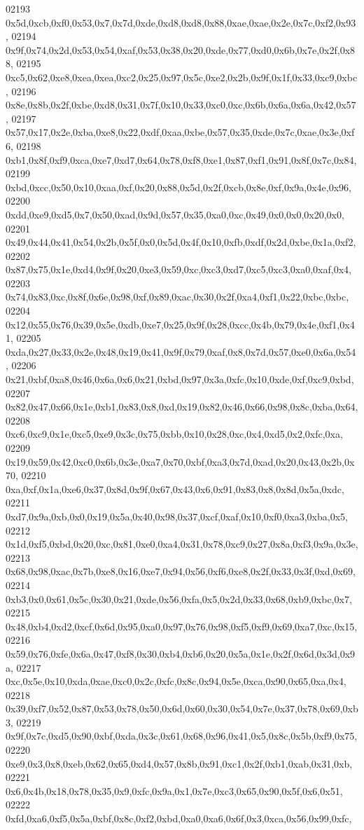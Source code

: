 \begin{DoxyCode}
02193   0x5d,0xcb,0xf0,0x53,0x7,0x7d,0xde,0xd8,0xd8,0x88,0xae,0xae,0x2e,0x7c,0xf2,0x93,
02194   0x9f,0x74,0x2d,0x53,0x54,0xaf,0x53,0x38,0x20,0xde,0x77,0xd0,0x6b,0x7e,0x2f,0x88,
02195   0xc5,0x62,0xe8,0xea,0xea,0xc2,0x25,0x97,0x5c,0xe2,0x2b,0x9f,0x1f,0x33,0xc9,0xbc,
02196   0x8e,0x8b,0x2f,0xbe,0xd8,0x31,0x7f,0x10,0x33,0xc0,0xc,0x6b,0x6a,0x6a,0x42,0x57,
02197   0x57,0x17,0x2e,0xba,0xe8,0x22,0xdf,0xaa,0xbe,0x57,0x35,0xde,0x7c,0xae,0x3e,0xf6,
02198   0xb1,0x8f,0xf9,0xca,0xe7,0xd7,0x64,0x78,0xf8,0xe1,0x87,0xf1,0x91,0x8f,0x7c,0x84,
02199   0xbd,0xcc,0x50,0x10,0xaa,0xf,0x20,0x88,0x5d,0x2f,0xcb,0x8e,0xf,0x9a,0x4e,0x96,
02200   0xdd,0xe9,0xd5,0x7,0x50,0xad,0x9d,0x57,0x35,0xa0,0xc,0x49,0x0,0x0,0x20,0x0,
02201   0x49,0x44,0x41,0x54,0x2b,0x5f,0x0,0x5d,0x4f,0x10,0xfb,0xdf,0x2d,0xbe,0x1a,0xf2,
02202   0x87,0x75,0x1e,0xd4,0x9f,0x20,0xe3,0x59,0xc,0xc3,0xd7,0xc5,0xc3,0xa0,0xaf,0x4,
02203   0x74,0x83,0xc,0x8f,0x6e,0x98,0xf,0x89,0xac,0x30,0x2f,0xa4,0xf1,0x22,0xbc,0xbc,
02204   0x12,0x55,0x76,0x39,0x5e,0xdb,0xe7,0x25,0x9f,0x28,0xcc,0x4b,0x79,0x4e,0xf1,0x41,
02205   0xda,0x27,0x33,0x2e,0x48,0x19,0x41,0x9f,0x79,0xaf,0x8,0x7d,0x57,0xe0,0x6a,0x54,
02206   0x21,0xbf,0xa8,0x46,0x6a,0x6,0x21,0xbd,0x97,0x3a,0xfc,0x10,0xde,0xf,0xc9,0xbd,
02207   0x82,0x47,0x66,0x1e,0xb1,0x83,0x8,0xd,0x19,0x82,0x46,0x66,0x98,0x8c,0xba,0x64,
02208   0xc6,0xc9,0x1e,0xc5,0xe9,0x3c,0x75,0xbb,0x10,0x28,0xc,0x4,0xd5,0x2,0xfc,0xa,
02209   0x19,0x59,0x42,0xc0,0x6b,0x3e,0xa7,0x70,0xbf,0xa3,0x7d,0xad,0x20,0x43,0x2b,0x70,
02210   0xa,0xf,0x1a,0xe6,0x37,0x8d,0x9f,0x67,0x43,0x6,0x91,0x83,0x8,0x8d,0x5a,0xdc,
02211   0xd7,0x9a,0xb,0x0,0x19,0x5a,0x40,0x98,0x37,0xcf,0xaf,0x10,0xf0,0xa3,0xba,0x5,
02212   0x1d,0xf5,0xbd,0x20,0xc,0x81,0xe0,0xa4,0x31,0x78,0xc9,0x27,0x8a,0xf3,0x9a,0x3e,
02213   0x68,0x98,0xac,0x7b,0xe8,0x16,0xe7,0x94,0x56,0xf6,0xe8,0x2f,0x33,0x3f,0xd,0x69,
02214   0xb3,0x0,0x61,0x5c,0x30,0x21,0xde,0x56,0xfa,0x5,0x2d,0x33,0x68,0xb9,0xbc,0x7,
02215   0x48,0xb4,0xd2,0xcf,0x6d,0x95,0xa0,0x97,0x76,0x98,0xf5,0xf9,0x69,0xa7,0xc,0x15,
02216   0x59,0x76,0xfe,0x6a,0x47,0xf8,0x30,0xb4,0xb6,0x20,0x5a,0x1e,0x2f,0x6d,0x3d,0x9a,
02217   0xc,0x5e,0x10,0xda,0xae,0xc0,0x2c,0xfc,0x8c,0x94,0x5e,0xca,0x90,0x65,0xa,0x4,
02218   0x39,0xf7,0x52,0x87,0x53,0x78,0x50,0x6d,0x60,0x30,0x54,0x7e,0x37,0x78,0x69,0xb3,
02219   0x9f,0x7c,0xd5,0x90,0xbf,0xda,0x3c,0x61,0x68,0x96,0x41,0x5,0x8c,0x5b,0xf9,0x75,
02220   0xe9,0x3,0x8,0xeb,0x62,0x65,0xd4,0x57,0x8b,0x91,0xc1,0x2f,0xb1,0xab,0x31,0xb,
02221   0x6,0x4b,0x18,0x78,0x35,0x9,0xfc,0x9a,0x1,0x7e,0xc3,0x65,0x90,0x5f,0x6,0x51,
02222   0xfd,0xa6,0xf5,0x5a,0xbf,0x8c,0xf2,0xbd,0xa0,0xa6,0x6f,0x3,0xca,0x56,0x99,0xfc,

\end{DoxyCode}

